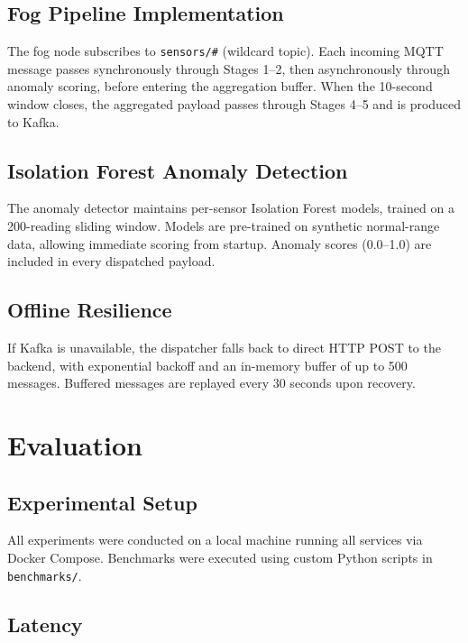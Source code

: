 \documentclass[conference]{IEEEtran}
\begin{document}
\subsection{Fog Pipeline Implementation}

The fog node subscribes to \texttt{sensors/\#} (wildcard topic). Each incoming MQTT message passes synchronously through Stages 1--2, then asynchronously through anomaly scoring, before entering the aggregation buffer. When the 10-second window closes, the aggregated payload passes through Stages 4--5 and is produced to Kafka.

\subsection{Isolation Forest Anomaly Detection}

The anomaly detector maintains per-sensor Isolation Forest models, trained on a 200-reading sliding window. Models are pre-trained on synthetic normal-range data, allowing immediate scoring from startup. Anomaly scores (0.0--1.0) are included in every dispatched payload.

\subsection{Offline Resilience}

If Kafka is unavailable, the dispatcher falls back to direct HTTP POST to the backend, with exponential backoff and an in-memory buffer of up to 500 messages. Buffered messages are replayed every 30 seconds upon recovery.

\section{Evaluation}
\label{sec:evaluation}

\subsection{Experimental Setup}

All experiments were conducted on a local machine running all services via Docker Compose. Benchmarks were executed using custom Python scripts in \texttt{benchmarks/}.

\subsection{Latency}
\end{document}
